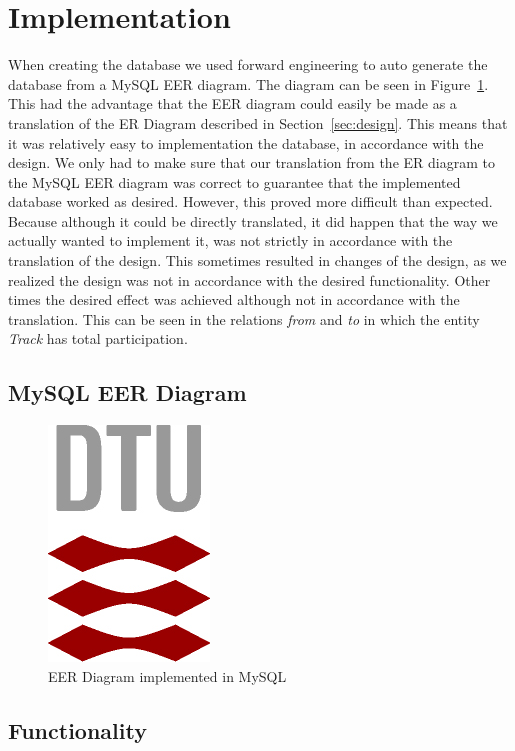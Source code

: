 \section{Implementation} \label{sec:implementation}

When creating the database we used forward engineering to auto generate the 
database from a MySQL EER diagram. The diagram can be seen in 
Figure~\ref{fig:EER}. This had the advantage that the EER diagram could easily 
be made as a translation of the ER Diagram described in 
Section~\ref{sec:design}. This means that it was relatively easy to 
implementation the database, in accordance with the design. We only had to make 
sure that our translation from the ER diagram to the MySQL EER diagram was 
correct to guarantee that the implemented database worked as desired. However, 
this proved more difficult than expected. Because although it could be directly 
translated, it did happen that the way we actually wanted to implement it, was 
not strictly in accordance with the translation of the design. This sometimes 
resulted in changes of the design, as we realized the design was not in 
accordance with the desired functionality. Other times the desired effect was 
achieved although not in accordance with the translation. This can be seen in 
the relations \emph{from} and \emph{to} in which the entity \emph{Track} has 
total participation. 


\subsection{MySQL EER Diagram}

\begin{figure}[h]
    \centering
    \includegraphics{img/DTU-logo}
    \caption{EER Diagram implemented in MySQL}
    \label{fig:EER}
\end{figure}


\subsection{Functionality} %

